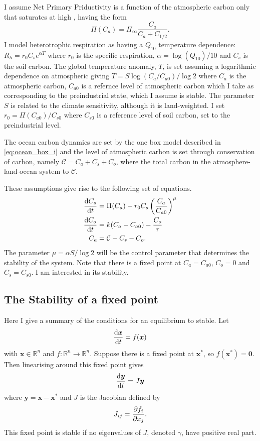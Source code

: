 I assume Net Primary Priductivity is a function of the atmospheric carbon only that saturates at high , having the form
\begin{equation}
  \label{eq:npp}
  \Pi(C_a) = \Pi_{\infty}\frac{C_a}{C_a + C_{1/2}}.
\end{equation}
I model heterotrophic respiration as having a $Q_{10}$ temperature dependence:
$R_h = r_0 C_s e^{\alpha T}$ where $r_0$ is the specific respiration, $\alpha = \log \left( Q_{10} \right)/10$ and $C_s$ is the soil carbon. The global temperature anomaly, $T$,
is set assuming a logarithmic dependence on atmospheric  giving $T = S \log \left(C_a / C_{a0}\right)/\log 2$ where $C_a$ is the atmospheric carbon, $C_{a0}$ is a refernce level of
atmospheric carbon which I take as corresponding to the preindustrial state, which I assume is stable. The parameter $S$ is related to the climate sensitivity, although it is land-weighted.
I set $r_0 = \Pi(C_{a0})/C_{s0}$ where $C_{s0}$ is a reference level of soil carbon, set to the preindustrial level.  

The ocean carbon dynamics are set by the one box model described in \cref{eq:ocean_box_i} and the level of atmospheric carbon is set through conservation of carbon, namely $\mathcal{C} = C_a + C_s + C_o$,
where the total carbon in the atmosphere-land-ocean system to $\mathcal{C}$.

These assumptions give rise to the following set of equations.
\begin{subequations}
  \label{eq:one_box_ocean}
  \begin{align}
    \dv{C_s}{t} &= \Pi(C_a) - r_0 C_s \left(\frac{C_a}{C_{a0}}\right)^{\mu} \\
    \dv{C_o}{t} &= k(C_a - C_{a0}) - \frac{C_o}{\tau} \\
    C_a &= \mathcal{C} - C_s - C_o.
\end{align}
\end{subequations}
The parameter $\mu = \alpha S / \log 2$ will be the control parameter that determines the stability of the system.
Note that there is a fixed point at $C_a = C_{a0}$, $C_o = 0$ and $C_s = C_{s0}$. I am interested in its stability.
\subsection{The Stability of a fixed point}
Here I give a summary of the conditions for an equilibrium to stable. Let
\begin{equation}
  \label{eq:generic_system}
  \dv{\bm{x}}{t} = f(\bm{x})
\end{equation}
with $\bm{x} \in \mathbb{R}^n$ and $f: \mathbb{R}^n \rightarrow \mathbb{R}^n$. Suppose there is a fixed point at $\bm{x}^*$, so $f(\bm{x}^*) = \bm{0}$. Then linearising around this
fixed point gives
\begin{equation}
  \label{eq:generic_system_linearised}
  \dv{\bm{y}}{t} = J\bm{y}
\end{equation}
where $\bm{y} = \bm{x} - \bm{x}^*$ and $J$ is the Jacobian defined by
\begin{equation}
  \label{eq:generic_jacobian}
  J_{ij} = \pdv{f_i}{x_j}.
\end{equation}
This fixed point is stable if no eigenvalues of $J$, denoted $\gamma$, have positive real part.
